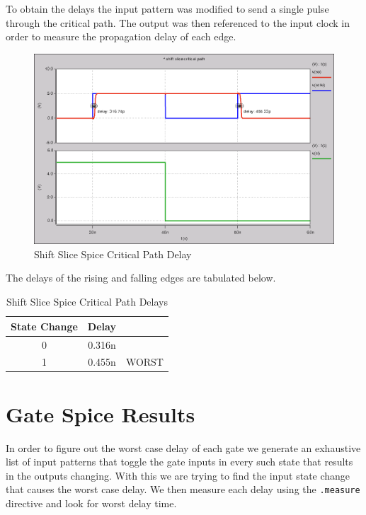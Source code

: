         \newpage

        To obtain the delays the input pattern was modified to send a single
        pulse through the critical path.  The output was then referenced to the
        input clock in order to measure the propagation delay of each edge.

        \begin{figure}[H]
            \centering
            \includegraphics[width=0.75\linewidth]{../../spice/shift_slice_crit_path.png}
            \caption{Shift Slice Spice Critical Path Delay}
        \end{figure}

        \vspace{\baselineskip}

        The delays of the rising and falling edges are tabulated below.

        \begin{table}[H]
            \centering
            \begin{tabular}{crc}
                \toprule
                \textbf{State Change} & \textbf{Delay} & \\
                \midrule
                0 & 0.316n & \\
                1 & 0.455n & WORST \\
                \bottomrule
            \end{tabular}
            \caption{Shift Slice Spice Critical Path Delays}
        \end{table}


    \newpage
\section{Gate Spice Results}
    In order to figure out the worst case delay of each gate we generate an
    exhaustive list of input patterns that toggle the gate inputs in every such
    state that results in the outputs changing. With this we are trying to find
    the input state change that causes the worst case delay. We then measure
    each delay using the \texttt{.measure} directive and look for worst
    delay time.

